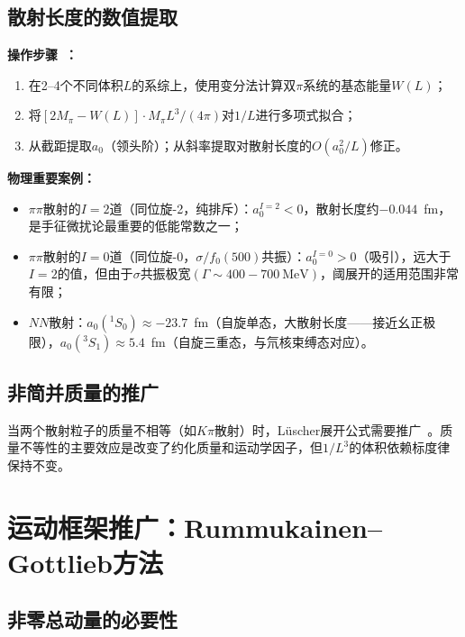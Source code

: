 \documentclass[12pt,a4paper]{ctexart}
\theoremstyle{definition}
\begin{document}
\subsection{散射长度的数值提取}

\textbf{操作步骤~\cite{decayChannels2026,GattringerLang2010}：}
\begin{enumerate}[leftmargin=*]
    \item 在2--4个不同体积$L$的系综上，使用变分法计算双$\pi$系统的基态能量$W(L)$；
    \item 将$[2M_\pi - W(L)] \cdot M_\pi L^3 / (4\pi)$对$1/L$进行多项式拟合；
    \item 从截距提取$a_0$（领头阶）；从斜率提取对散射长度的$O(a_0^2/L)$修正。
\end{enumerate}

\textbf{物理重要案例：}
\begin{itemize}[leftmargin=*]
    \item $\pi\pi$散射的$I=2$道（同位旋-2，纯排斥）：$a_0^{I=2} < 0$，散射长度约$-0.044$~fm，是手征微扰论最重要的低能常数之一；
    \item $\pi\pi$散射的$I=0$道（同位旋-0，$\sigma/f_0(500)$共振）：$a_0^{I=0} > 0$（吸引），远大于$I=2$的值，但由于$\sigma$共振极宽$(\Gamma \sim 400-700\ \text{MeV})$，阈展开的适用范围非常有限；
    \item $NN$散射：$a_0({}^1S_0) \approx -23.7$~fm（自旋单态，大散射长度——接近幺正极限），$a_0({}^3S_1) \approx 5.4$~fm（自旋三重态，与氘核束缚态对应）。
\end{itemize}

\subsection{非简并质量的推广}

当两个散射粒子的质量不相等（如$K\pi$散射）时，L\"uscher展开公式需要推广~\cite{GattringerLang2010}。质量不等性的主要效应是改变了约化质量和运动学因子，但$1/L^3$的体积依赖标度律保持不变。

\section{运动框架推广：Rummukainen--Gottlieb方法}

\subsection{非零总动量的必要性}
\end{document}

